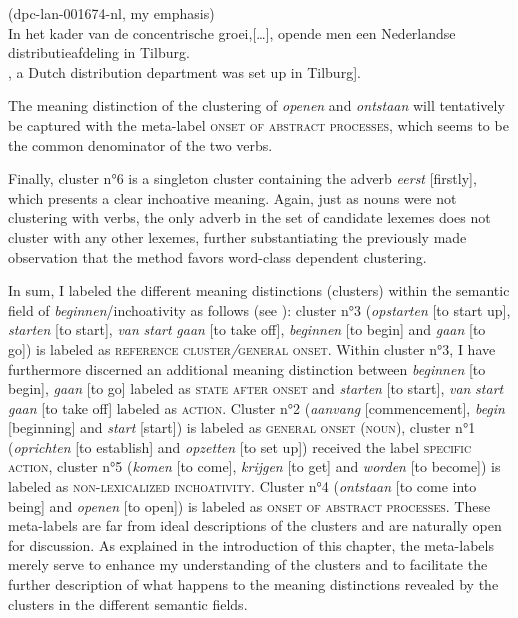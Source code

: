 \ea\label{ex:14}(dpc-lan-001674-nl, my emphasis)\\
In het kader van de concentrische groei,[…], opende men een Nederlandse distributieafdeling in Tilburg.\\\relax
[\textsc{target:} Within the framework of concentric growth, [...], a Dutch distribution department was set up in Tilburg].
\z

The meaning distinction of the clustering of \textit{openen} and \textit{ontstaan} will tentatively be captured with the meta-label \textsc{onset of abstract processes}, which seems to be the common denominator of the two verbs.

Finally, cluster n°6 is a singleton cluster containing the adverb \textit{eerst} [firstly], which presents a clear inchoative meaning. Again, just as nouns were not clustering with verbs, the only adverb in the set of candidate lexemes does not cluster with any other lexemes, further substantiating the previously made observation that the method favors word-class dependent clustering.

In sum, I labeled the different meaning distinctions (clusters) within the semantic field of \textit{beginnen}/inchoativity as follows (see ): cluster n°3 (\textit{opstarten} [to start up], \textit{starten} [to start], \textit{van} \textit{start} \textit{gaan} [to take off], \textit{beginnen} [to begin] and \textit{gaan} [to go]) is labeled as \textsc{reference cluster}\textit{/}\textsc{general onset}. Within cluster n°3, I have furthermore discerned an additional meaning distinction between \textit{beginnen} [to begin], \textit{gaan} [to go] labeled as \textsc{state after onset} and \textit{starten} [to start], \textit{van} \textit{start} \textit{gaan} [to take off] labeled as \textsc{action}. Cluster n°2 (\textit{aanvang} [commencement], \textit{begin} [beginning] and \textit{start} [start]) is labeled as \textsc{general onset} (\textsc{noun}), cluster n°1 (\textit{oprichten} [to establish] and \textit{opzetten} [to set up]) received the label {\textsc{specific}} \textsc{action}, cluster n°5 (\textit{komen} [to come], \textit{krijgen} [to get] and \textit{worden} [to become]) is labeled as {\textsc{non-lexicalized inchoativity}}. Cluster n°4 (\textit{ontstaan} [to come into being] and \textit{openen} [to open]) is labeled as {\textsc{onset of abstract processes}}. These meta-labels are far from ideal descriptions of the clusters and are naturally open for discussion. As explained in the introduction of this chapter, the meta-labels merely serve to enhance my understanding of the clusters and to facilitate the further description of what happens to the meaning distinctions revealed by the clusters in the different semantic fields.

